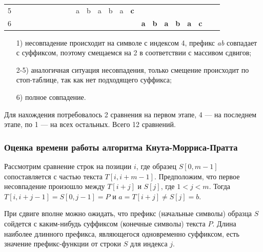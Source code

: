 \documentclass[a4paper,12pt]{article}
\begin{document}
\begin{table} [h!]
\begin{center}
\begin{tabular}{|rrrrrrrrrrrrrrrrrrrrrrr|}
			5 &            &            &            &            &            &            &            &            &          a &          b &          a &          b &          a &    {\bf c} &            &            &            &            &            &            &            &            \\
			
			6 &            &            &            &            &            &            &            &            &            &            &            &            &            &            &    {\bf a} &    {\bf b} &    {\bf a} &    {\bf b} &    {\bf a} &    {\bf c} &            &            \\
			\hline
		\end{tabular}  
		\label{bm_cmp}
	\end{center}
\end{table}

\begin{itemize}
	\item[1)] несовпадение происходит на символе с индексом 4,
	префикс \textit{ab} совпадает с суффиксом, поэтому смещаемся на 2
	в соответствии с массивом сдвигов;
	\item[2-5)] аналогичная ситуация несовпадения,
	только смещение происходит по стоп-таблице, так как нет подходящего суффикса;
	\item[6)] полное совпадение.
\end{itemize}

Для нахождения потребовалось 2 сравнения на первом этапе,
4 --- на последнем этапе, по 1 --- на всех остальных. Всего 12 сравнений.

\subsubsection{Оценка времени работы алгоритма Кнута-Морриса-Пратта}

Рассмотрим сравнение строк на позиции
$i$, где образец $S[0, m - 1]$
сопоставляется с частью текста
$T[i, i + m - 1]$.
Предположим, что первое несовпадение произошло
между $T[i + j]$ и $S[j]$,
где $1 < j < m$. Тогда
$T[i, i + j - 1] = S[0, j - 1] = P$ и
$a = T[i + j] \neq S[j] = b$.

При сдвиге вполне можно ожидать, что префикс 
(начальные символы)
образца $S$ сойдется с каким-нибудь суффиксом 
(конечные символы) текста $P$. Длина наиболее 
длинного префикса, являющегося одновременно 
суффиксом, есть значение префикс-функции от строки 
$S$ для 
индекса $j$.
\end{document}
